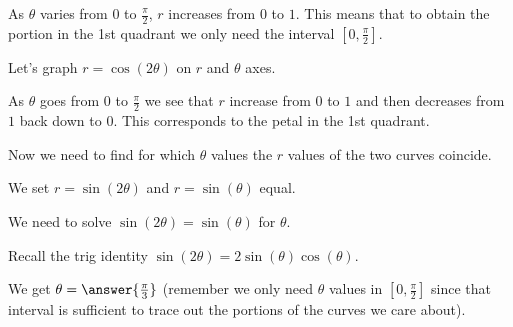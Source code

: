 \documentclass{ximera}
\begin{document}
\begin{exercise}
\begin{exercise}
\begin{hint}
As $\theta$ varies from $0$ to $\frac{\pi}{2}$, $r$ increases from $0$ to $1$. This means that to obtain the portion in the 1st quadrant we only need the interval $[0, \frac{\pi}{2}]$. 


Let's graph $r=\cos(2\theta)$ on $r$ and $\theta$ axes. 

\begin{image}  
\end{image} 


As $\theta$ goes from $0$ to $\frac{\pi}{2}$ we see that $r$ increase from $0$ to $1$ and then decreases from $1$ back down to $0$. This corresponds to the petal in the 1st quadrant. 

Now we need to find for which $\theta$ values the $r$ values of the two curves coincide. 

We set $r=\sin(2\theta)$ and $r=\sin(\theta)$ equal. 

We need to solve $\sin(2\theta)=\sin(\theta)$ for $\theta$. 

Recall the trig identity $\sin(2\theta)=2\sin(\theta)\cos(\theta)$. 

We get $\theta=\answer{\frac{\pi}{3}}$ (remember we only need $\theta$ values in $[0,\frac{\pi}{2}]$ since that interval is sufficient to trace out the portions of the curves we care about). 















\end{hint}

\end{exercise}
\end{exercise}
\end{document}
